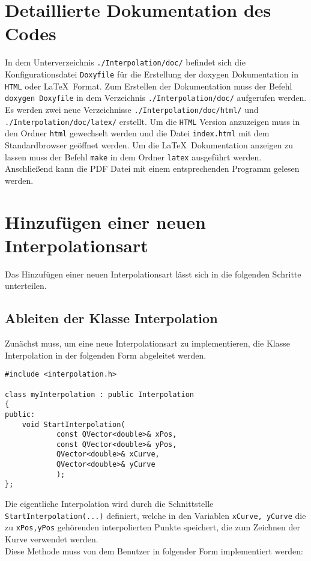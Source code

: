 \section{Detaillierte Dokumentation des Codes}
In dem Unterverzeichnis {\tt ./Interpolation/doc/} befindet sich die Konfigurationsdatei {\tt Doxyfile} f\"ur die Erstellung der doxygen Dokumentation in {\tt HTML} oder \LaTeX\ Format. Zum Erstellen der Dokumentation muss der Befehl {\tt doxygen Doxyfile} in dem Verzeichnis {\tt ./Interpolation/doc/} aufgerufen werden. Es werden zwei neue Verzeichnisse {\tt ./Interpolation/doc/html/} und {\tt ./Interpolation/doc/latex/} erstellt. Um die {\tt HTML} Version anzuzeigen muss in den Ordner {\tt html} gewechselt werden und die Datei {\tt index.html} mit dem Standardbrowser ge\"offnet werden. Um die \LaTeX\ Dokumentation anzeigen zu lassen muss der Befehl {\tt make} in dem Ordner {\tt latex} ausgef\"uhrt werden. Anschlie\ss end kann die PDF Datei mit einem entsprechenden Programm gelesen werden.

\section{Hinzuf\"ugen einer neuen Interpolationsart}
Das Hinzuf\"ugen einer neuen Interpolationsart l\"asst sich in die folgenden Schritte unterteilen. 

\subsection{Ableiten der Klasse Interpolation}
Zun\"achst muss, um eine neue Interpolationsart zu implementieren, die Klasse Interpolation in der folgenden Form abgeleitet werden.

\begin{lstlisting}
#include <interpolation.h>

class myInterpolation : public Interpolation
{
public:
	void StartInterpolation(
            const QVector<double>& xPos,
            const QVector<double>& yPos,
            QVector<double>& xCurve,
            QVector<double>& yCurve
            );
};
\end{lstlisting}

Die eigentliche Interpolation wird durch die Schnittstelle {\tt StartInterpolation(...)} definiert, welche in den Variablen {\tt xCurve, yCurve} die zu {\tt xPos,yPos} geh\"orenden interpolierten Punkte speichert, die zum Zeichnen der Kurve verwendet werden.\\
Diese Methode muss von dem Benutzer in folgender Form implementiert werden:

